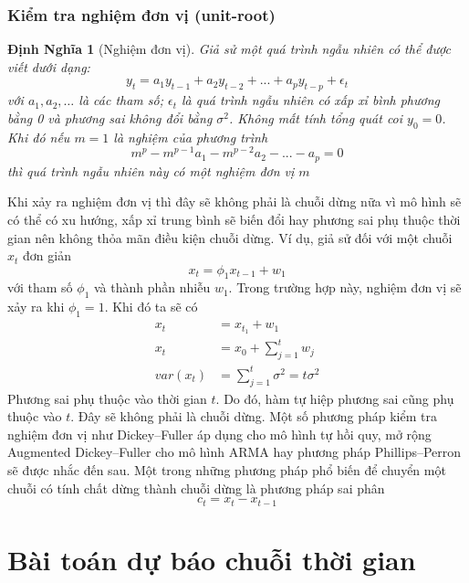 \documentclass[twoside,12pt]{Latex/Classes/PhDthesisPSnPDF}
\newtheorem{defi}{Định Nghĩa}[chapter]
\begin{document}
\subsubsection{Kiểm tra nghiệm đơn vị (unit-root)}
\begin{defi}[Nghiệm đơn vị]\label{unit_root}
Giả sử một quá trình ngẫu nhiên có thể được viết dưới dạng:
\begin{equation}
	y_t = a_1y_{t-1}+a_2y_{t-2}+...+a_py_{t-p}+\epsilon_t
\end{equation}
	với $a_1,a_2,\dots$ là các tham số; $\epsilon_t$ là quá trình ngẫu nhiên có xấp xỉ bình phương bằng 0 và phương sai không đổi bằng $\sigma^{2}$. Không mất tính tổng quát coi $y_0 = 0$.
	Khi đó nếu $m=1$ là nghiệm của phương trình 
	\begin{equation}
		m^p - m^{p-1}a_1 - m^{p-2}a_2 - ... - a_p = 0 
	\end{equation}
	thì quá trình ngẫu nhiên này có một nghiệm đơn vị $m$
\end{defi}
Khi xảy ra nghiệm đơn vị thì đây sẽ không phải là chuỗi dừng nữa vì mô hình sẽ có thể có xu hướng, xấp xỉ trung bình sẽ biến đổi hay phương sai phụ thuộc thời gian nên không thỏa mãn điều kiện chuỗi dừng. Ví dụ, giả sử đối với một chuỗi $x_t$ đơn giản
\begin{equation}
	x_t = \phi_1x_{t-1}+w_1
\end{equation}
với tham số $\phi_1$ và thành phần nhiễu $w_1$. Trong trường hợp này, nghiệm đơn vị sẽ xảy ra khi $\phi_1=1$.
Khi đó ta sẽ có 
	\begin{align}
		x_t&= x_{t_1}+w_1 \\
		x_t&=x_0+\sum\limits_{j=1}^{t}w_j\\
		var(x_t) &= \sum\limits_{j=1}^{t}\sigma^2 = t\sigma^2
	\end{align}
	Phương sai phụ thuộc vào thời gian $t$. Do đó, hàm tự hiệp phương sai cũng phụ thuộc vào $t$. Đây sẽ không phải là chuỗi dừng.
Một số phương pháp kiểm tra nghiệm đơn vị như Dickey–Fuller áp dụng cho mô hình tự hồi quy, mở rộng Augmented Dickey–Fuller cho mô hình ARMA hay phương pháp Phillips–Perron sẽ được nhắc đến sau.
Một trong những phương pháp phổ biến để chuyển một chuỗi có tính chất dừng thành chuỗi dừng là phương pháp sai phân
\begin{equation}
	c_t = x_{t} - x_{t-1}
\end{equation}

\section{Bài toán dự báo chuỗi thời gian}
\end{document}
